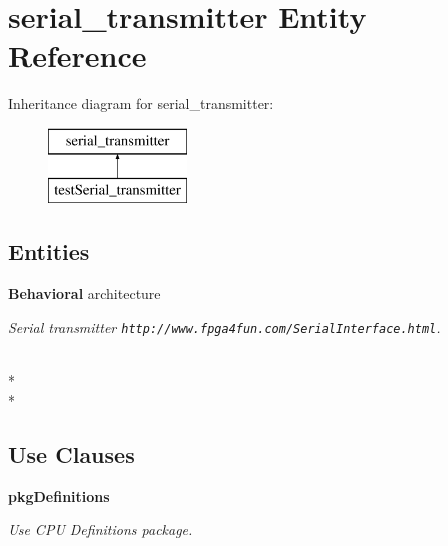 \section{serial\-\_\-transmitter Entity Reference}
\label{classserial__transmitter}
Inheritance diagram for serial\-\_\-transmitter\-:\begin{figure}[H]
\begin{center}
\leavevmode
\includegraphics[height=2.000000cm]{classserial__transmitter}
\end{center}
\end{figure}
\subsection*{Entities}
\begin{DoxyCompactItemize}
\item 
{\bf Behavioral} architecture
\begin{DoxyCompactList}\small\item\em Serial transmitter {\tt http\-://www.\-fpga4fun.\-com/\-Serial\-Interface.\-html}. \end{DoxyCompactList}\end{DoxyCompactItemize}
\\*
\\*
\subsection*{Use Clauses}
 \begin{DoxyCompactItemize}
\item 
{\bf pkg\-Definitions}   \label{classserial__transmitter_ac442dca664056131bdaf5c92e4351e01}

\begin{DoxyCompactList}\small\item\em Use C\-P\-U Definitions package. \end{DoxyCompactList}\end{DoxyCompactItemize}
